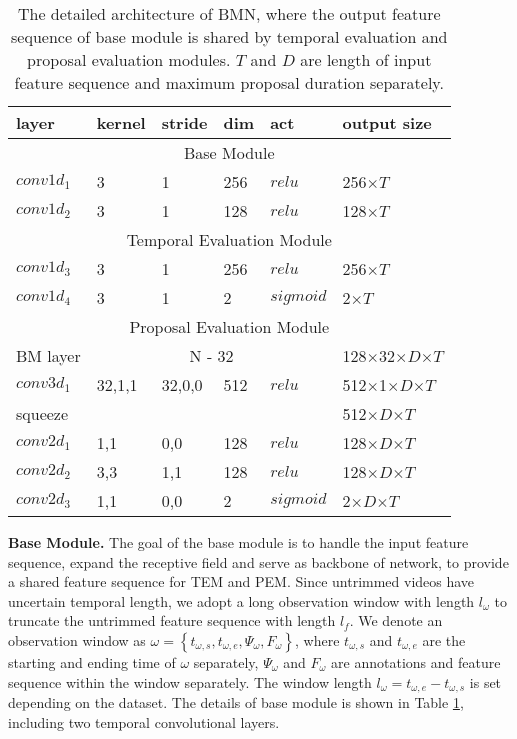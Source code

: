 \documentclass[10pt,twocolumn,letterpaper]{article}
\begin{document}
\begin{table}[tbp]
\centering
\caption{The detailed architecture of BMN, where the output feature sequence of base module is shared by temporal evaluation and proposal evaluation modules. $T$ and $D$ are length of input feature sequence and maximum proposal duration separately.   }
\small
\begin{tabular}{p{1.28cm}|p{0.6cm}p{0.6cm}p{0.3cm}p{1.0cm}|p{2.0cm}}
\hline
 layer & kernel & stride & dim & act & output size\\
\hline
\multicolumn{6}{c}{ Base Module} \\
\hline
 $conv1d_1$ & 3 &  1 &  256 & $relu$ & 256$\times T$\\
\hline
 $conv1d_2$ & 3 &  1 &  128 & $relu$ & 128$\times T$\\
\hline
\multicolumn{6}{c}{ Temporal Evaluation Module} \\
\hline
 $conv1d_3$ & 3 &  1 &  256 & $relu$ & 256$\times T$\\
\hline
 $conv1d_4$ &  3 &  1 &  2 & $sigmoid$  & 2$\times T$\\
\hline
\multicolumn{6}{c}{ Proposal Evaluation Module}\\
\hline
 BM layer & \multicolumn{4}{c|}{ N - 32}  & 128$\times$32$\times D$$\times T$\\
\hline
 $conv3d_1$ & 32,1,1 & 32,0,0 & 512 & $relu$  & 512$\times$1$\times D$$\times T$\\
\hline
 squeeze & & & & & 512$\times D$$\times T$\\
\hline
 $conv2d_1$ & 1,1 & 0,0 & 128 & $relu$   & 128$\times D$$\times T$\\
\hline
 $conv2d_2$ & 3,3 & 1,1 & 128 & $relu$   & 128$\times D$$\times T$\\
\hline 
 $conv2d_3$ & 1,1 & 0,0 & 2 & $sigmoid$  &  2$\times D$$\times T$\\
\hline
\end{tabular}
\label{table:bmn_layer}
\end{table}

\noindent
\textbf{Base Module.}
The goal of the base module is to handle the input feature sequence, expand the receptive field and serve as backbone of network, to provide a shared feature sequence for TEM and PEM.
Since untrimmed videos have uncertain temporal length, we adopt a long observation window with length $l_{\omega}$ to truncate the untrimmed feature sequence with length $l_f$.
We denote an observation window as  $\omega =\left \{ t_{\omega,s}, t_{\omega,e}, \Psi_{\omega}, F_{\omega}  \right \}$, where $t_{\omega,s}$ and $t_{\omega,e}$ are the starting and ending time of $\omega$ separately, $\Psi_{\omega}$ and $F_{\omega}$   are annotations and feature sequence  within the window separately.
The window length $l_{\omega} = t_{\omega,e} - t_{\omega,s}$ is set depending on the dataset.
The details of base module is shown in Table \ref{table:bmn_layer}, including two temporal convolutional layers.
\end{document}

